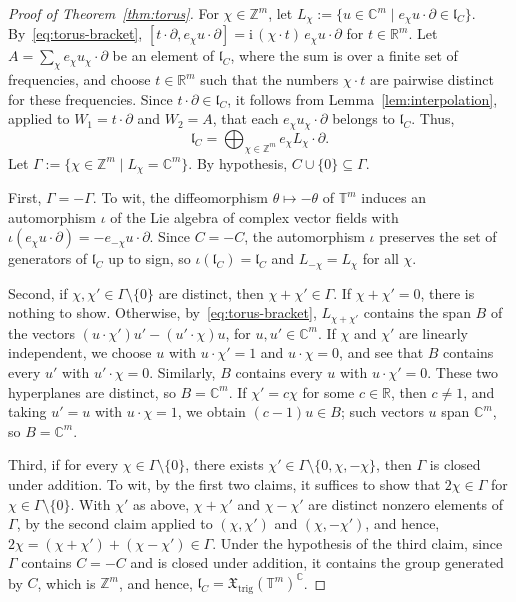 \documentclass{article}
\newcommand{\R}{\mathbb{R}}
\newcommand{\C}{\mathbb{C}}
\newcommand{\Z}{\mathbb{Z}}
\newcommand{\T}{\mathbb{T}}
\newcommand{\xtrig}{\mathfrak X_{\mathrm{trig}}}
\theoremstyle{definition}
\theoremstyle{plain}
\begin{document}
\begin{proof}[Proof of Theorem~\ref{thm:torus}]
For $\chi\in\Z^m$, let $L_\chi:=\{u\in\C^m\mid e_\chi u\cdot\partial\in\mathfrak l_C\}$.
By~\eqref{eq:torus-bracket}, $[t\cdot\partial,e_\chi u\cdot\partial]=\mathrm{i}\,(\chi\cdot t)\,e_\chi u\cdot\partial$ for $t\in\R^m$.
Let $A=\sum_\chi e_\chi u_\chi\cdot\partial$ be an element of $\mathfrak l_C$, where the sum is over a finite set of frequencies,
and choose $t\in\R^m$ such that the numbers $\chi\cdot t$ are pairwise distinct for these frequencies.
Since $t\cdot\partial\in\mathfrak l_C$, it follows from Lemma~\ref{lem:interpolation}, applied to $W_1=t\cdot\partial$ and $W_2=A$, that each $e_\chi u_\chi\cdot\partial$ belongs to $\mathfrak l_C$. Thus,
$$
  \mathfrak l_C=\bigoplus_{\chi\in\Z^m}e_\chi L_\chi\cdot\partial.
$$
Let $\Gamma:=\{\chi\in\Z^m\mid L_\chi=\C^m\}$. By hypothesis, $C\cup\{0\}\subseteq\Gamma$.


First, $\Gamma=-\Gamma$. To wit, the diffeomorphism $\theta\mapsto-\theta$ of $\T^m$ induces an automorphism $\iota$ of the Lie algebra of complex vector fields with $\iota(e_\chi u\cdot\partial)=-e_{-\chi}u\cdot\partial$. Since $C=-C$,
    the automorphism $\iota$ preserves the set of generators of $\mathfrak l_C$ up to sign, so $\iota(\mathfrak l_C)=\mathfrak l_C$ and $L_{-\chi}=L_\chi$ for all $\chi$.

Second, if $\chi,\chi'\in\Gamma\setminus\{0\}$ are distinct, then $\chi+\chi'\in\Gamma$.
If $\chi+\chi'=0$, there is nothing to show. Otherwise, by~\eqref{eq:torus-bracket}, $L_{\chi+\chi'}$ contains the span $B$ of the vectors $(u\cdot\chi')u'-(u'\cdot\chi)u$, for $u,u'\in\C^m$.
If $\chi$ and $\chi'$ are linearly independent, we choose $u$ with $u\cdot\chi'=1$ and $u\cdot\chi=0$, and see that $B$ contains every $u'$ with $u'\cdot\chi=0$. Similarly, $B$ contains every $u$ with $u\cdot\chi'=0$. These two hyperplanes are distinct, so $B=\C^m$.
If $\chi'=c\chi$ for some $c\in\R$, then $c\neq1$, and taking $u'=u$ with $u\cdot\chi=1$, we obtain $(c-1)u\in B$; such vectors $u$ span $\C^m$, so $B=\C^m$.

Third, if for every $\chi\in\Gamma\setminus\{0\}$, there exists $\chi'\in\Gamma\setminus\{0,\chi,-\chi\}$, then $\Gamma$ is closed under addition.
To wit, by the first two claims, it suffices to show that $2\chi\in\Gamma$ for $\chi\in\Gamma\setminus\{0\}$. With $\chi'$ as above,
$\chi+\chi'$ and $\chi-\chi'$ are distinct nonzero elements of $\Gamma$, by the second claim applied to $(\chi,\chi')$ and $(\chi,-\chi')$, and hence, $2\chi=(\chi+\chi')+(\chi-\chi')\in\Gamma$.
Under the hypothesis of the third claim, since $\Gamma$ contains $C=-C$ and is closed under addition, it contains the group generated by $C$, which is $\Z^m$, and hence, $\mathfrak l_C=\xtrig(\T^m)^\C$.


\end{proof}
\end{document}
